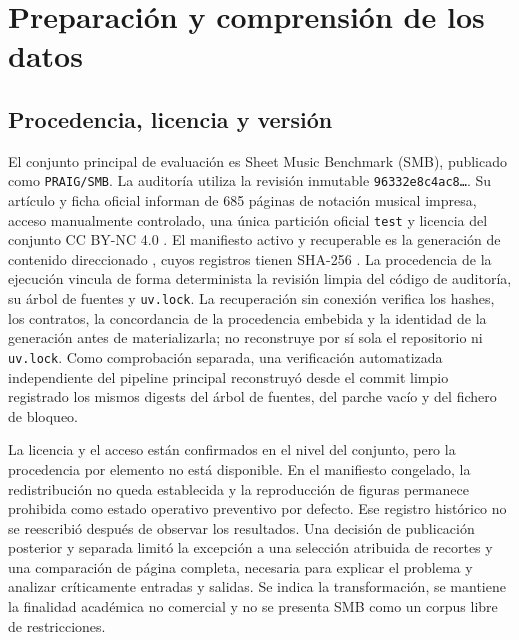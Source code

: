 \chapter{Preparación y comprensión de los datos}

\section{Procedencia, licencia y versión}
El conjunto principal de evaluación es Sheet Music Benchmark (SMB), publicado como
\texttt{PRAIG/SMB}. La auditoría utiliza la revisión inmutable
\texttt{96332e8c4ac8\ldots}. Su artículo y ficha oficial informan de
685 páginas de notación musical impresa, acceso manualmente controlado, una única partición oficial
\texttt{test} y licencia del conjunto CC BY-NC 4.0
\cite{martinez2025smb,smbDatasetCard,ccByNc40}.
El manifiesto activo y recuperable es la generación de contenido direccionado
, cuyos registros
tienen SHA-256
. La procedencia de
la ejecución vincula de forma determinista la revisión limpia del código de auditoría, su árbol de
fuentes y \texttt{uv.lock}. La recuperación sin conexión verifica los hashes, los contratos, la
concordancia de la procedencia embebida y la identidad de la generación antes de materializarla;
no reconstruye por sí sola el repositorio ni \texttt{uv.lock}. Como comprobación separada, una
verificación automatizada independiente del pipeline principal reconstruyó desde el commit limpio
registrado los mismos digests del árbol de fuentes, del parche vacío y del fichero de bloqueo.

La licencia y el acceso están confirmados en el nivel del conjunto, pero la procedencia por elemento
no está disponible. En el manifiesto congelado, la redistribución no queda establecida y la
reproducción de figuras permanece prohibida como estado operativo preventivo por defecto. Ese
registro histórico no se reescribió después de observar los resultados. Una decisión de
publicación posterior y separada limitó la excepción a una selección atribuida de recortes y una
comparación de página completa, necesaria para explicar el problema y analizar críticamente
entradas y salidas. Se indica la transformación, se mantiene la finalidad académica no comercial y
no se presenta SMB como un corpus libre de restricciones.

